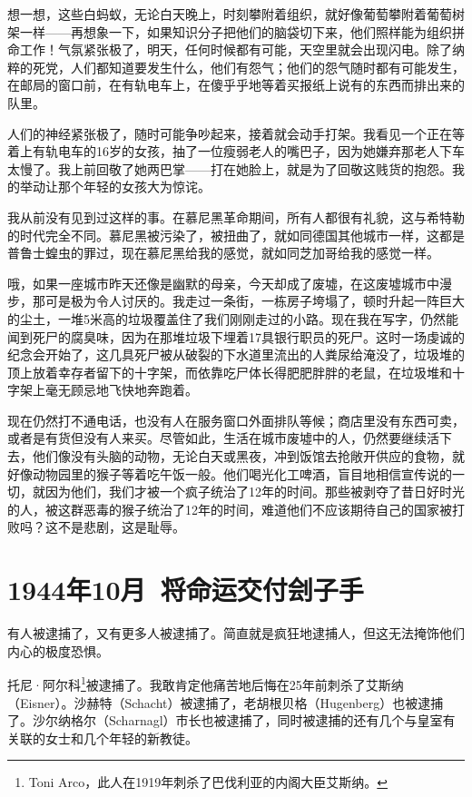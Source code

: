 \documentclass[UTF8]{ctexart}
\begin{document}
想一想，这些白蚂蚁，无论白天晚上，时刻攀附着组织，就好像葡萄攀附着葡萄树架一样——再想象一下，如果知识分子把他们的脑袋切下来，他们照样能为组织拼命工作！气氛紧张极了，明天，任何时候都有可能，天空里就会出现闪电。除了纳粹的死党，人们都知道要发生什么，他们有怨气；他们的怨气随时都有可能发生，在邮局的窗口前，在有轨电车上，在傻乎乎地等着买报纸上说有的东西而排出来的队里。

人们的神经紧张极了，随时可能争吵起来，接着就会动手打架。我看见一个正在等着上有轨电车的16岁的女孩，抽了一位瘦弱老人的嘴巴子，因为她嫌弃那老人下车太慢了。我上前回敬了她两巴掌——打在她脸上，就是为了回敬这贱货的抱怨。我的举动让那个年轻的女孩大为惊诧。

我从前没有见到过这样的事。在慕尼黑革命期间，所有人都很有礼貌，这与希特勒的时代完全不同。慕尼黑被污染了，被扭曲了，就如同德国其他城市一样，这都是普鲁士蝗虫的罪过，现在慕尼黑给我的感觉，就如同芝加哥给我的感觉一样。

哦，如果一座城市昨天还像是幽默的母亲，今天却成了废墟，在这废墟城市中漫步，那可是极为令人讨厌的。我走过一条街，一栋房子垮塌了，顿时升起一阵巨大的尘土，一堆5米高的垃圾覆盖住了我们刚刚走过的小路。现在我在写字，仍然能闻到死尸的腐臭味，因为在那堆垃圾下埋着17具银行职员的死尸。这时一场虔诚的纪念会开始了，这几具死尸被从破裂的下水道里流出的人粪尿给淹没了，垃圾堆的顶上放着幸存者留下的十字架，而依靠吃尸体长得肥肥胖胖的老鼠，在垃圾堆和十字架上毫无顾忌地飞快地奔跑着。

现在仍然打不通电话，也没有人在服务窗口外面排队等候；商店里没有东西可卖，或者是有货但没有人来买。尽管如此，生活在城市废墟中的人，仍然要继续活下去，他们像没有头脑的动物，无论白天或黑夜，冲到饭馆去抢敞开供应的食物，就好像动物园里的猴子等着吃午饭一般。他们喝光化工啤酒，盲目地相信宣传说的一切，就因为他们，我们才被一个疯子统治了12年的时间。那些被剥夺了昔日好时光的人，被这群恶毒的猴子统治了12年的时间，难道他们不应该期待自己的国家被打败吗？这不是悲剧，这是耻辱。

\section{1944年10月\ 将命运交付刽子手}

有人被逮捕了，又有更多人被逮捕了。简直就是疯狂地逮捕人，但这无法掩饰他们内心的极度恐惧。

托尼·阿尔科\footnote{Toni Arco，此人在1919年刺杀了巴伐利亚的内阁大臣艾斯纳。}被逮捕了。我敢肯定他痛苦地后悔在25年前刺杀了艾斯纳（Eisner）。沙赫特（Schacht）被逮捕了，老胡根贝格（Hugenberg）也被逮捕了。沙尔纳格尔（Scharnagl）市长也被逮捕了，同时被逮捕的还有几个与皇室有关联的女士和几个年轻的新教徒。
\end{document}
